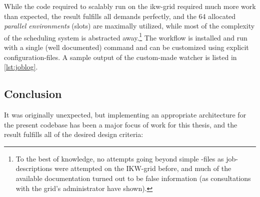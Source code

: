 While the code required to scalably run on the \gls{ikw}-grid required much more work than expected, the result fulfills all demands perfectly, %
and the 64 allocated \emph{parallel environments} (slots) are maximally utilized, while most of the complexity of the scheduling system is abstracted away.\footnote{To the best of \my knowledge, no attempts going beyond simple -files as job-descriptions were attempted on the IKW-grid before, and much of the available documentation turned out to be false information (as consultations with the grid's administrator have shown).} The workflow is installed and run with a single (well documented) command and can be customized using explicit configuration-files. A sample output of the custom-made watcher is listed in \autoref{lst:joblog}.  


\subsection{Conclusion}

It was originally unexpected, but implementing an appropriate architecture for the present codebase has been a major focus of work for this thesis, and the result fulfills all of the desired design criteria: 


